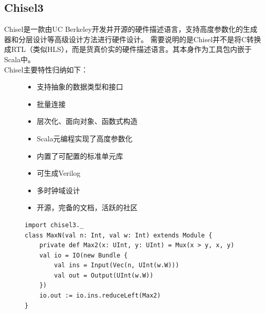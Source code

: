     \subsection{Chisel3}
        Chisel是一款由UC Berkeley开发并开源的硬件描述语言，支持高度参数化的生成器和分层设计等高级设计方法进行硬件设计。
        需要说明的是Chisel并不是将C转换成RTL（类似HLS），而是货真价实的硬件描述语言。其本身作为工具包内嵌于Scala中。 \\
        Chisel主要特性归纳如下：
        \begin{figure}[h]
            \begin{itemize}[topsep = 0 pt]
                \setlength{\topsep}{0pt}
                \setlength{\itemsep}{0pt}
                \setlength{\parsep}{0pt}
                \setlength{\parskip}{0pt}
                \setlength{\partopsep}{0pt}
                \item 支持抽象的数据类型和接口
                \item 批量连接
                \item 层次化、面向对象、函数式构造
                \item Scala元编程实现了高度参数化
                \item 内置了可配置的标准单元库
                \item 可生成Verilog
                \item 多时钟域设计
                \item 开源，完备的文档，活跃的社区
            \end{itemize}       

            \begin{lstlisting}[title=Chisel Example, frame=shadowbox]
import chisel3._
class MaxN(val n: Int, val w: Int) extends Module {
    private def Max2(x: UInt, y: UInt) = Mux(x > y, x, y)
    val io = IO(new Bundle {
        val ins = Input(Vec(n, UInt(w.W)))
        val out = Output(UInt(w.W))
    })
    io.out := io.ins.reduceLeft(Max2)
}
            \end{lstlisting}
        \end{figure}

